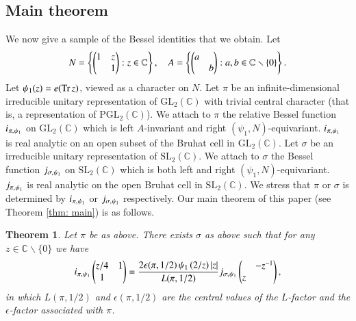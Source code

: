 \documentclass{amsproc}
\newcommand{\BC}{{\mathbb {C}}} \newcommand{\BD}{{\mathbb {D}}}
\newcommand{\GL}{{\mathrm {GL}}} \newcommand{\PGL}{{\mathrm {PGL}}}
\newcommand{\SL}{{\mathrm {SL}}} \newcommand{\PSL}{{\mathrm {PSL}}}
\def\-{^{-1}}
\def\lp {\left (}
\def\rp {\right )}
\theoremstyle{plain}
\newtheorem{thm}{Theorem}[section] \newtheorem{cor}[thm]{Corollary}
\numberwithin{equation}{section}
\begin{document}
	\subsection{Main theorem}
	We now give a sample of the Bessel identities that we obtain.
	Let
	\begin{align*}
	N = \left\{ \begin{pmatrix}
	1 & z \\ & 1
	\end{pmatrix} : z \in \BC \right\}, \hskip 10 pt A =  \left\{ \begin{pmatrix}
	a &   \\ & b
	\end{pmatrix} : a, b \in \BC \smallsetminus \{0\} \right\}.
	\end{align*}
	Let $\psi_1 (z) = e ({\mathrm{Tr}} \, z )$, viewed  as a character on $N$. Let $\pi$ be an  infinite-dimensional  irreducible unitary representation of $\GL_2 (\BC)$  with trivial central character (that is, a representation of $  \PGL_2 (\BC)$). We attach to  $\pi$   the relative Bessel function  $ i_{\hskip 0.5 pt \pi, \hskip 0.5 pt \psi_1} $  on $\GL_2 (\BC)$ which  is left $A$-invariant  and right $(\psi_1, N)$-equivariant.
	 $ i_{\hskip 0.5 pt \pi, \hskip 0.5 pt \psi_1} $ is real analytic on an open subset of the Bruhat cell in $\GL_2 (\BC)$. Let $\sigma$ be
	an irreducible unitary representation of $\SL_2 (\BC)$.
	We attach to $\sigma$ the Bessel function $j_{\sigma, \hskip 0.5 pt \psi_1}$    on $\SL_2 (\BC)$   which    is both left and right $(\psi_1, N)$-equivariant.  $j_{\pi, \hskip 0.5 pt \psi_1}$ is real analytic on the open Bruhat cell in $\SL_2 (\BC)$. We stress that $\pi$ or $\sigma$ is determined by $ i_{\hskip 0.5 pt \pi, \hskip 0.5 pt \psi_1} $ or $ j_{\sigma, \hskip 0.5 pt \psi_1}$ respectively. Our main theorem of this
	paper (see Theorem \ref{thm: main}) is as follows.
	
	
	\begin{thm}\label{thm: main, intro} Let   $\pi $ be as above. There exists $\sigma$ as above such that for any $z \in \BC \smallsetminus \{0\}$ we have
		\begin{align}\label{0eq: Bessel identity}
		i_{\hskip 0.5 pt \pi, \hskip 0.5 pt \psi_1} \begin{pmatrix}
		z / 4 & 1 \\ 1 &
		\end{pmatrix}
		= \frac {2 \epsilon (\pi, 1/2) \, \psi_1     \lp   2 / z \rp |z|} {L(\pi, 1/2)}  j_{\sigma, \hskip 0.5 pt \psi_1} \begin{pmatrix}
		& - z\- \\ z \\
		\end{pmatrix},
		\end{align}
		in which $L (\pi, 1/2)$ and  $\epsilon (\pi, 1/2)$ are the central values of the $L$-factor and the $\epsilon$-factor associated with $ \pi $.
	\end{thm}
	
\end{document}
